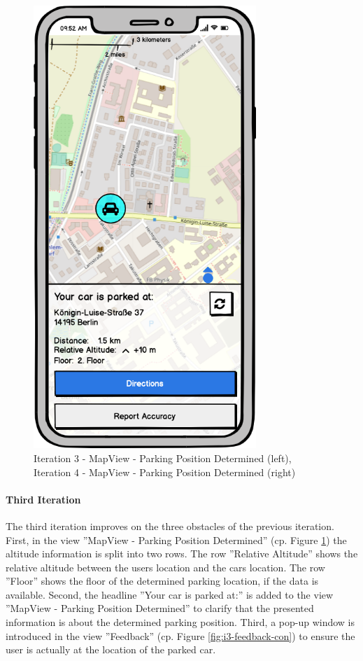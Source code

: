 \begin{figure}[h]
\begin{minipage}[b]{0.45\textwidth}
    \includegraphics[width=0.75\textwidth]{images/UI/Iteration4-MapView-ParkingPositionDetermined.png}
  \end{minipage}
  \caption{Iteration 3 - MapView - Parking Position Determined (left), Iteration 4 - MapView - Parking Position Determined (right)}
  \label{fig:i3-i4}
\end{figure}

\paragraph{Third Iteration}

The third iteration improves on the three obstacles of the previous iteration. 
First, in the view ''MapView - Parking Position Determined'' (cp. Figure \ref{fig:i3-i4}) the altitude information is split  into two rows. The row ''Relative Altitude'' shows the relative altitude between the users location and the cars location. The row ''Floor'' shows the floor of the determined parking location, if the data is available. Second, the headline ''Your car is parked at:'' is added to the view ''MapView - Parking Position Determined'' to clarify that the presented information is about the determined parking position. Third, a pop-up window is introduced in the view ''Feedback'' (cp. Figure \ref{fig:i3-feedback-con}) to ensure the user is actually at the location of the parked car. 

